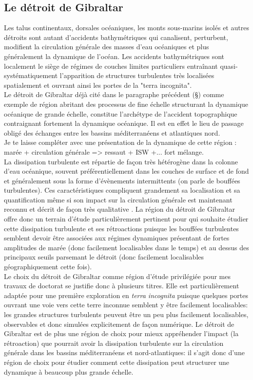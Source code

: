 
\subsection{Le détroit de Gibraltar}
\color{blue}
Les talus continentaux, dorsales océaniques, les monts sous-marins isolés et autres détroits sont autant d'accidents bathymétriques qui canalisent, perturbent, modifient la circulation générale des masses d'eau océaniques et plus généralement la dynamique de l'océan. Les accidents bathymétriques sont localement le siège de régimes de couches limites particuliers entraînant quasi-systématiquement l'apparition de structures turbulentes très localisées spatialement et ouvrant ainsi les portes de la "terra incognita".\\
Le détroit de Gibraltar déjà cité dans le paragraphe précédent (\S {}) comme exemple de région abritant des processus de fine échelle structurant la dynamique océanique de grande échelle, constitue l'archétype de l'accident topographique contraignant fortement la dynamique océanique. Il est en effet le lieu de passage obligé des échanges entre les bassins méditerranéens et atlantiques nord.\\
\color{red}
Je te laisse compléter avec une présentation de la dynamique de cette région : marée + circulation générale => ressaut + ISW +... fort mélange.\\
\color{blue}
La dissipation turbulente est répartie de façon très hétérogène dans la colonne d'eau océanique, souvent préférentiellement dans les couches de surface et de fond et généralement sous la forme d'évènements intermittents (on parle de bouffées turbulentes). Ces caractéristiques compliquent grandement sa localisation et sa quantification même si son impact sur la circulation générale est maintenant reconnu et décrit de façon très qualitative \cite{de_lavergne_abyssal_2017}. La région du détroit de Gibraltar offre donc un terrain d'étude particulièrement pertinent pour qui souhaite étudier cette dissipation turbulente et ses rétroactions puisque les bouffées turbulentes semblent devoir être associées aux régimes dynamiques présentant de fortes amplitudes de marée (donc facilement localisables dans le temps) et au dessus des principaux seuils parsemant le détroit (donc facilement localisables géographiquement cette fois).\\
Le choix du détroit de Gibraltar comme région d'étude privilégiée pour mes travaux de doctorat se justifie donc à plusieurs titres. Elle est particulièrement adaptée pour une première exploration en \textit{terra incognita} puisque quelques portes ouvrant une voie vers cette terre inconnue semblent y être facilement localisables: les grandes structures turbulents peuvent être un peu plus facilement localisables, observables et donc simulées explicitement de façon numérique. Le détroit de Gibraltar est de plus une région de choix pour mieux appréhender l'impact (la rétroaction) que pourrait avoir la dissipation turbulente sur la circulation générale dans les bassins méditerranéens et nord-atlantiques: il s'agit donc d'une région de choix pour étudier comment cette dissipation peut structurer une dynamique à beaucoup plus grande échelle.
